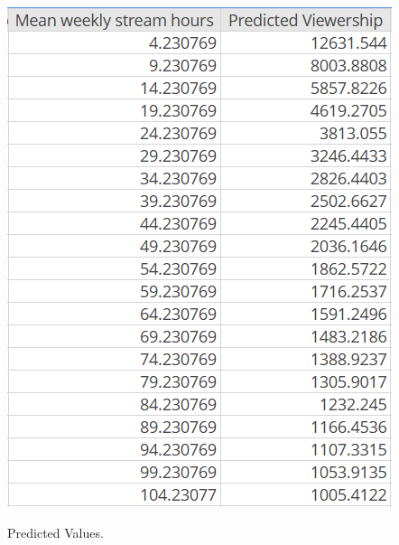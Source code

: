\documentclass[12pt]{article}
\begin{document}
\begin{table}[H]
  \centering
  \includegraphics[scale=1]{../StatCrunch_Results/reciprocal/prediction_matrix}
  \captionsetup{justification=centering, singlelinecheck=false, margin=2cm}
  \caption[Prediction Matrix]{Predicted Values.}
  \label{tab:prediction_matrix}
\end{table}

\end{document}
